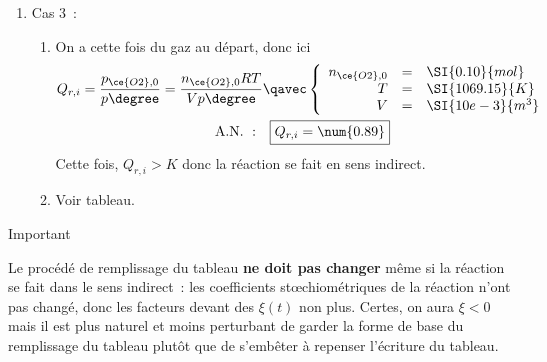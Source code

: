 \documentclass[a4paper, 12pt, final, garamond]{book}
\begin{document}
\begin{enumerate}[resume]
    \item Cas 3~:
        \begin{enumerate}
            \item On a cette fois du gaz au départ, donc ici
                \begin{gather*}
                    Q_{r,i}
                    = \frac{p_{\ce{O2}, 0}}{p\degree}
                    = \frac{n_{\ce{O2}, 0}RT}{Vp\degree}
                    \qavec
                    \left\{
                        \begin{array}{rcl}
                            n_{\ce{O2}, 0} & = & \SI{0.10}{mol}\\
                            T & = & \SI{1069.15}{K}\\
                            V & = & \SI{10e-3}{m^3}
                        \end{array}
                    \right.\\
                    \mathrm{A.N.~:}\quad
                    \boxed{Q_{r,i} = \num{0.89}}
                \end{gather*}
                Cette fois, $Q_{r,i} > K$ donc la réaction se fait en sens
                indirect.
            \item Voir tableau.
        \end{enumerate}
\end{enumerate}
\begin{NCror}[width=\textwidth]{Important}

    Le procédé de remplissage du tableau \textbf{ne doit pas changer} même si la
    réaction se fait dans le sens indirect~: les coefficients stœchiométriques
    de la réaction n'ont pas changé, donc les facteurs devant des $\xi(t)$ non
    plus. Certes, on aura $\xi < 0$ mais il est plus naturel et moins perturbant
    de garder la forme de base du remplissage du tableau plutôt que de s'embêter
    à repenser l'écriture du tableau.

\end{NCror}
\end{document}
